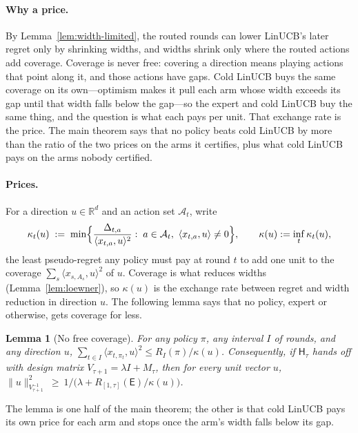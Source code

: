 \documentclass{article}
\newtheorem{lemma}{Lemma}
\theoremstyle{definition}
\theoremstyle{remark}
\newcommand{\R}{\mathbb{R}}
\theoremstyle{remark}
\newcommand{\Exp}{\mathsf{E}}
\newcommand{\Hyb}{\mathsf{H}}
\begin{document}
\paragraph{Why a price.}
By Lemma~\ref{lem:width-limited}, the routed rounds can lower LinUCB's later
regret only by shrinking widths, and widths shrink only where the routed
actions add coverage. Coverage is never free: covering a direction means
playing actions that point along it, and those actions have gaps. Cold
LinUCB buys the same coverage on its own---optimism makes it pull each arm
whose width exceeds its gap until that width falls below the gap---so the
expert and cold LinUCB buy the same thing, and the question is what each pays
per unit. That exchange rate is the price. The main theorem says that no
policy beats cold LinUCB by more than the ratio of the two prices on the
arms it certifies, plus what cold LinUCB pays on the arms nobody certified.

\paragraph{Prices.}
For a direction $u\in\R^d$ and an
action set $\mathcal A_t$, write
\begin{equation}
\label{eq:price}
\kappa_t(u)\;:=\;\min\Bigl\{\frac{\Delta_{t,a}}{\langle x_{t,a},u\rangle^2}:\;a\in\mathcal A_t,\ \langle x_{t,a},u\rangle\neq0\Bigr\},
\qquad \kappa(u):=\inf_t\kappa_t(u),
\end{equation}
the least pseudo-regret any policy must pay at round $t$ to add one unit to
the coverage $\sum_s\langle x_{s,A_s},u\rangle^2$ of $u$. Coverage is what
reduces widths (Lemma~\ref{lem:loewner}), so $\kappa(u)$ is the exchange rate
between regret and width reduction in direction $u$. The following lemma
says that no policy, expert or otherwise, gets coverage for less.

\begin{lemma}[No free coverage]
\label{lem:no-free-coverage}
For any policy $\pi$, any interval $I$ of rounds, and any direction $u$,
$\sum_{t\in I}\langle x_{t,\pi_t},u\rangle^2\le R_I(\pi)/\kappa(u)$.
Consequently, if $\Hyb_\tau$ hands off with design matrix $V_{\tau+1}=\lambda I+M_\tau$, then
for every unit vector $u$,
$\|u\|^2_{V_{\tau+1}^{-1}}\ \ge\ 1\big/\bigl(\lambda+R_{[1,\tau]}(\Exp)/\kappa(u)\bigr)$.
\end{lemma}

The lemma is one half of the main theorem; the other is that cold LinUCB
pays its own price for each arm and stops once the arm's width falls below
its gap.
\end{document}
